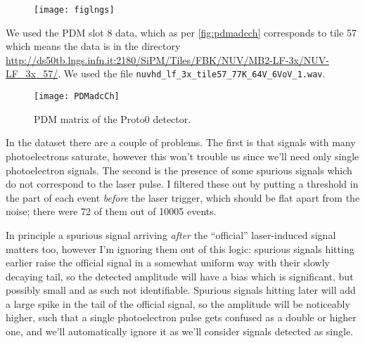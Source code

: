 
\begin{figure}
    \hspace{-0.26\textwidth}\texttt{[image: figlngs]}
    

\end{figure}

We used the PDM slot 8 data, which as per \autoref{fig:pdmadcch} corresponds
to tile 57 which means the data is in the directory
\url{http://ds50tb.lngs.infn.it:2180/SiPM/Tiles/FBK/NUV/MB2-LF-3x/NUV-LF_3x_57/}. We used the file \nolinkurl{nuvhd_lf_3x_tile57_77K_64V_6VoV_1.wav}.


\begin{figure}
    \texttt{[image: PDMadcCh]}
    
    \caption{\label{fig:pdmadcch} PDM matrix of the Proto0 detector.}

\end{figure}

In the dataset there are a couple of problems. The first is that signals with
many photoelectrons saturate, however this won't trouble us since we'll need
only single photoelectron signals. The second is the presence of some spurious
signals which do not correspond to the laser pulse. I filtered these out by
putting a threshold in the part of each event \emph{before} the laser trigger,
which should be flat apart from the noise; there were 72 of them out of
\num{10005} events.

In principle a spurious signal arriving \emph{after} the ``official''
laser-induced signal matters too, however I'm ignoring them out of this logic:
spurious signals hitting earlier raise the official signal in a somewhat
uniform way with their slowly decaying tail, so the detected amplitude will
have a bias which is significant, but possibly small and as such not
identifiable. Spurious signals hitting later will add a large spike in the tail
of the official signal, so the amplitude will be noticeably higher, such that a
single photoelectron pulse gets confused as a double or higher one, and
we'll automatically ignore it as we'll consider signals detected as single.

